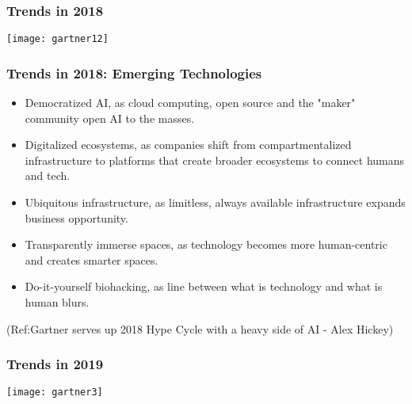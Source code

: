 \begin{frame}[fragile]\frametitle{Trends in 2018}

\begin{center}
\texttt{[image: gartner12]}
\end{center}


\end{frame}

\begin{frame}[fragile]\frametitle{Trends in 2018: Emerging Technologies}
\begin{itemize}
\item Democratized AI, as cloud computing, open source and the "maker" community open AI to the masses.

\item Digitalized ecosystems, as companies shift from compartmentalized infrastructure to platforms that create broader ecosystems to connect humans and tech.

\item Ubiquitous infrastructure, as limitless, always available infrastructure expands business opportunity.

\item Transparently immerse spaces, as technology becomes more human-centric and creates smarter spaces.

\item Do-it-yourself biohacking, as line between what is technology and what is human blurs.

\end{itemize}


{\tiny (Ref:Gartner serves up 2018 Hype Cycle with a heavy side of AI - Alex Hickey)}

\end{frame}

\begin{frame}[fragile]\frametitle{Trends in 2019}

\begin{center}
\texttt{[image: gartner3]}
\end{center}

\end{frame}

